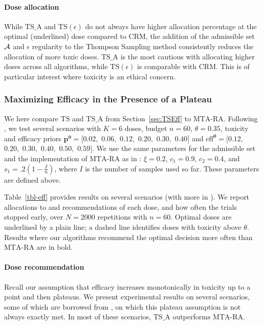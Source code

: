 \paragraph{Dose allocation} While $\mathrm{TS}\_\mathrm{A}$ and $\mathrm{TS}(\epsilon)$ do not always have higher allocation percentage at the optimal (underlined) dose compared to CRM,
the addition of the admissible set $\mathcal{A}$ and $\epsilon$ regularity to the Thompson Sampling method consistently reduces the allocation of more toxic doses. $\mathrm{TS}\_\mathrm{A}$ is the most cautious with allocating higher doses across all algorithms, while $\mathrm{TS}(\epsilon)$ is comparable with CRM. This is of particular interest where toxicity is an ethical concern.

\subsubsection{Maximizing Efficacy in the Presence of a Plateau} \label{subsec:toxOnlyExp}

We here compare $\mathrm{TS}$ and $\mathrm{TS}\_\mathrm{A}$
from Section~\ref{sec:TSEff} to $\mathrm{MTA}$-$\mathrm{RA}$.
Following \cite{MKR17}, we test several scenarios with $K=6$ doses, budget $n=60$, $\theta = 0.35$, toxicity and efficacy priors
$\bm{p^0} = [0.02,$ $0.06,$ $0.12,$ $0.20,$ $0.30,$ $0.40]$ and
$\bm{\mathrm{eff}^0} = [0.12,$ $0.20,$ $0.30,$ $0.40,$ $0.50,$ $0.59]$.
We use the same parameters for the admissible set and the implementation of $\mathrm{MTA}$-$\mathrm{RA}$ as in \cite{MKR17}: $\xi=0.2$, $c_1=0.9$, $c_2=0.4$, and $s_1=.2\left(1-\frac{I}{n}\right)$, where $I$ is the number of samples used so far. These parameters are defined above.
 


Table~\ref{tbl-eff} provides results on several scenarios (with more in ). We report allocations to and recommendations of each dose, and how often the trials stopped early, over $N=2000$ repetitions with $n=60$.
Optimal doses are underlined by a plain line; a dashed line identifies doses with toxicity above $\theta$. Results where
our algorithms recommend the optimal decision more often than 
$\mathrm{MTA}$-$\mathrm{RA}$ are in bold.

\paragraph{Dose recommendation}  
Recall our assumption that efficacy increases monotonically in toxicity up to a point and then plateaus. We present experimental results on several scenarios, some of which are borrowed from \cite{MKR17}, on which this plateau assumption is not always exactly met. In most of these scenarios, $\mathrm{TS}\_\mathrm{A}$ outperforms $\mathrm{MTA}$-$\mathrm{RA}$. 

